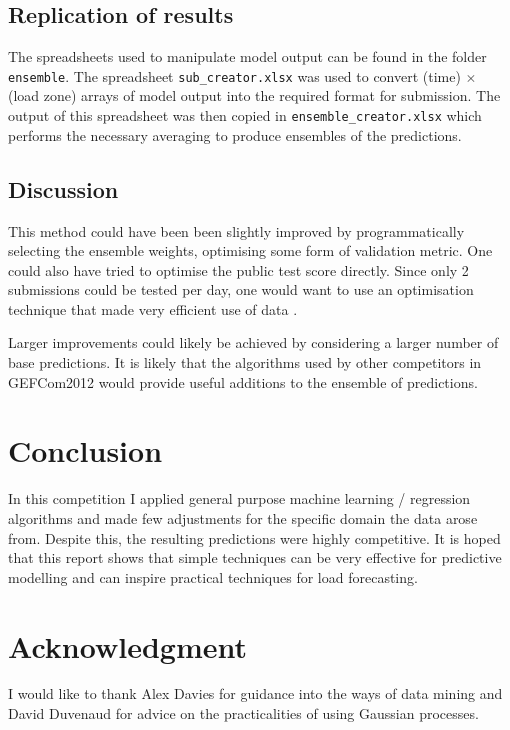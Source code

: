 \documentclass[preprint,authoryear,12pt]{elsarticle}
\begin{document}
\subsection{Replication of results}

The spreadsheets used to manipulate model output can be found in the folder \texttt{ensemble}.
The spreadsheet \texttt{sub\_creator.xlsx} was used to convert (time) $\times$ (load zone) arrays of model output into the required format for submission.
The output of this spreadsheet was then copied in \texttt{ensemble\_creator.xlsx} which performs the necessary averaging to produce ensembles of the predictions.

\subsection{Discussion}

This method could have been been slightly improved by programmatically selecting the ensemble weights, optimising some form of validation metric.
One could also have tried to optimise the public test score directly.
Since only 2 submissions could be tested per day, one would want to use an optimisation technique that made very efficient use of data \citep[e.g.][]{Osborne2009, snoek2012practical}.

Larger improvements could likely be achieved by considering a larger number of base predictions.
It is likely that the algorithms used by other competitors in GEFCom2012 would provide useful additions to the ensemble of predictions.

\section{Conclusion}

In this competition I applied general purpose machine learning / regression algorithms and made few adjustments for the specific domain the data arose from.
Despite this, the resulting predictions were highly competitive.
It is hoped that this report shows that simple techniques can be very effective for predictive modelling and can inspire practical techniques for load forecasting.

\section*{Acknowledgment}

I would like to thank Alex Davies for guidance into the ways of data mining and David Duvenaud for advice on the practicalities of using Gaussian processes.
\end{document}
